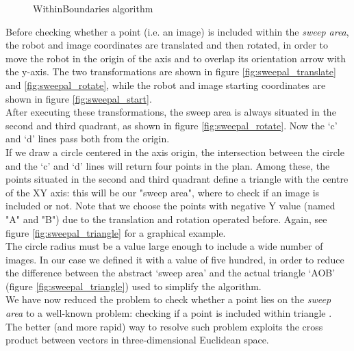 \begin{figure}[htp]
\begin{center}
    \vspace*{20pt}

  \end{center}
  \caption{WithinBoundaries algorithm}
  \label{fig:withingboundaries}
\end{figure}


Before checking whether a point (i.e. an image) is included 
within the \textit{sweep area}, the robot and image coordinates
are translated and then rotated, in order to move the robot in 
the origin of the axis and to overlap its orientation arrow with 
the y-axis. The two transformations are shown in figure 
\ref{fig:sweepal_translate} and \ref{fig:sweepal_rotate}, 
while the robot and image starting coordinates are shown in 
figure \ref{fig:sweepal_start}.
\\
After executing these transformations, the sweep area is always 
situated in the second and third quadrant, as 
shown in figure \ref{fig:sweepal_rotate}. Now the `c' and `d' 
lines pass both from the origin.
\\
If we draw a circle centered in the axis origin, the intersection 
between the circle and the `c' and `d' lines will
return four points in the plan. Among these, the points situated 
in the second and third quadrant define a triangle
with the centre of the XY axis: this will be our "sweep area", 
where to check if an image is included or not. Note
that we choose the points with negative Y value (named "A" and "B") 
due to the translation and rotation operated
before. Again, see figure \ref{fig:sweepal_triangle} 
for a graphical example.
\\
The circle radius must be a value large enough to include a wide 
number of images. In our case we defined it with a
value of five hundred, in order to reduce the difference between 
the abstract `sweep area' and the actual triangle 
`AOB' (figure \ref{fig:sweepal_triangle}) used to simplify the algorithm.
\\
We have now reduced the problem to check whether a point 
lies on the \textit{sweep area} to a well-known problem:
checking if a point is included within triangle
\cite{withinboundaries:pointintriangle}. 
The better (and more rapid) way to resolve such problem 
exploits the cross product between vectors
in three-dimensional Euclidean space.

